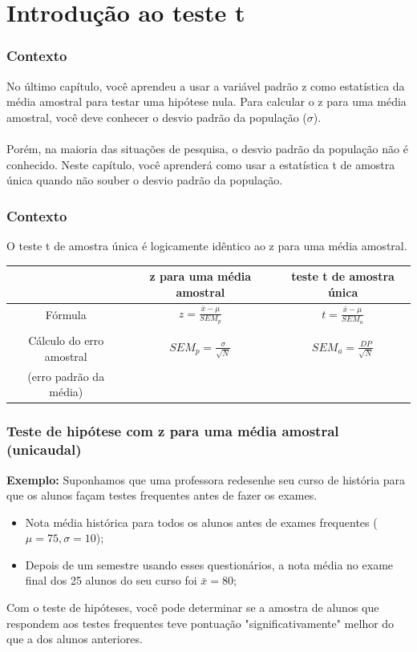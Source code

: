 \documentclass[11pt]{beamer}
\begin{document}
\section{Introdução ao teste t}
\begin{frame}
\frametitle{Contexto}
No último capítulo, você aprendeu a usar a variável padrão z como estatística da média amostral para testar uma hipótese nula. Para calcular o z para uma média amostral, você deve conhecer o desvio padrão da população ($\sigma$). \\~\\ 
  
Porém, na maioria das situações de pesquisa, o desvio padrão da população não é conhecido. Neste capítulo, você aprenderá como usar a estatística t de amostra única quando não souber o desvio padrão da população.
\end{frame}

\begin{frame}
\frametitle{Contexto}
O teste t de amostra única é logicamente idêntico ao z para uma média amostral.

\begin{center}
\small
\begin{tabular}{ccc} 
 \hline
 &	z para uma média amostral & teste t de amostra única\\
 \hline
Fórmula & $z = \frac{\bar{x}-\mu}{SEM_p}$ & $t =\frac{\bar{x}-\mu}{SEM_a}$\\
 &  & \\
Cálculo do erro amostral & $SEM_p = \frac{\sigma}{\sqrt{N}}$ & $SEM_a = \frac{DP}{\sqrt{N}}$\\
(erro padrão da média) &  & \\
 \hline
\end{tabular}
\end{center}

\end{frame}

\begin{frame}
\frametitle{Teste de hipótese com z para uma média amostral (unicaudal)}

\textbf{Exemplo:} Suponhamos que uma professora redesenhe seu curso de história para que os alunos façam testes frequentes antes de fazer os exames.

\begin{itemize}
\item
  Nota média histórica para todos os alunos antes de exames frequentes (\(\mu = 75, \sigma = 10\));
\item
  Depois de um semestre usando esses questionários, a nota média no exame final dos 25 alunos do seu curso foi \(\bar{x} = 80\);
\end{itemize}

Com o teste de hipóteses, você pode determinar se a amostra de alunos que respondem aos testes frequentes teve pontuação "significativamente" melhor do que a dos alunos anteriores.

\end{frame}
\end{document}
